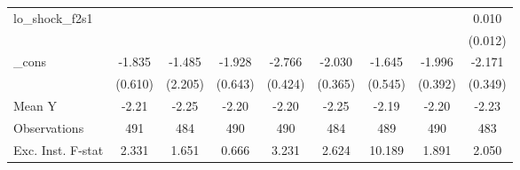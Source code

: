 {\begin{tabular}{l*{8}{c}}
\addlinespace
lo\_shock\_f2s1&                     &                     &                     &                     &                     &                     &                     &       0.010         \\
            &                     &                     &                     &                     &                     &                     &                     &     (0.012)         \\
\addlinespace
\_cons      &      -1.835\sym{***}&      -1.485         &      -1.928\sym{***}&      -2.766\sym{***}&      -2.030\sym{***}&      -1.645\sym{***}&      -1.996\sym{***}&      -2.171\sym{***}\\
            &     (0.610)         &     (2.205)         &     (0.643)         &     (0.424)         &     (0.365)         &     (0.545)         &     (0.392)         &     (0.349)         \\
\midrule
Mean Y      &       -2.21         &       -2.25         &       -2.20         &       -2.20         &       -2.25         &       -2.19         &       -2.20         &       -2.23         \\
Observations&         491         &         484         &         490         &         490         &         484         &         489         &         490         &         483         \\
Exc. Inst. F-stat&       2.331         &       1.651         &       0.666         &       3.231         &       2.624         &      10.189         &       1.891         &       2.050         \\
\bottomrule
\end{tabular}
}

